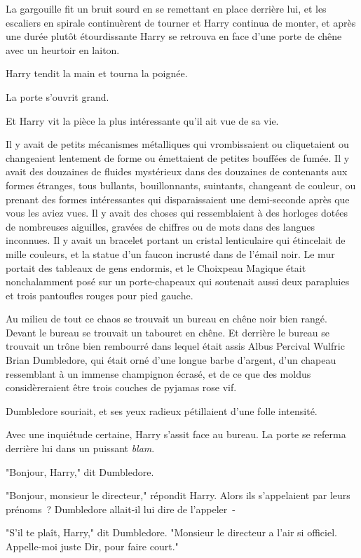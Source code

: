 La gargouille fit un bruit sourd en se remettant en place derrière lui, et les escaliers en spirale continuèrent de tourner et Harry continua de monter, et après une durée plutôt étourdissante Harry se retrouva en face d'une porte de chêne avec un heurtoir en laiton.

Harry tendit la main et tourna la poignée.

La porte s'ouvrit grand.

Et Harry vit la pièce la plus intéressante qu'il ait vue de sa vie.

Il y avait de petits mécanismes métalliques qui vrombissaient ou cliquetaient ou changeaient lentement de forme ou émettaient de petites bouffées de fumée. Il y avait des douzaines de fluides mystérieux dans des douzaines de contenants aux formes étranges, tous bullants, bouillonnants, suintants, changeant de couleur, ou prenant des formes intéressantes qui disparaissaient une demi-seconde après que vous les aviez vues. Il y avait des choses qui ressemblaient à des horloges dotées de nombreuses aiguilles, gravées de chiffres ou de mots dans des langues inconnues. Il y avait un bracelet portant un cristal lenticulaire qui étincelait de mille couleurs, et la statue d'un faucon incrusté dans de l'émail noir. Le mur portait des tableaux de gens endormis, et le Choixpeau Magique était nonchalamment posé sur un porte-chapeaux qui soutenait aussi deux parapluies et trois pantoufles rouges pour pied gauche.

Au milieu de tout ce chaos se trouvait un bureau en chêne noir bien rangé. Devant le bureau se trouvait un tabouret en chêne. Et derrière le bureau se trouvait un trône bien rembourré dans lequel était assis Albus Percival Wulfric Brian Dumbledore, qui était orné d'une longue barbe d'argent, d'un chapeau ressemblant à un immense champignon écrasé, et de ce que des moldus considèreraient être trois couches de pyjamas rose vif.

Dumbledore souriait, et ses yeux radieux pétillaient d'une folle intensité.

Avec une inquiétude certaine, Harry s'assit face au bureau. La porte se referma derrière lui dans un puissant \emph{blam}.

"Bonjour, Harry," dit Dumbledore.

"Bonjour, monsieur le directeur," répondit Harry. Alors ils s'appelaient par leurs prénoms~? Dumbledore allait-il lui dire de l'appeler~-

"S'il te plaît, Harry," dit Dumbledore. "Monsieur le directeur a l'air si officiel. Appelle-moi juste Dir, pour faire court."

